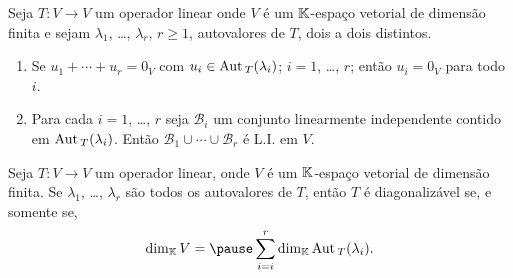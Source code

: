 \documentclass{beamer}
\begin{document}
    \begin{frame}
        \begin{teorema}
            Seja $T : V \to V$ um operador linear \pause onde $V$ é um $\mathbb{K}$-espaço vetorial de dimensão finita \pause e sejam $\lambda_1$, \pause \dots, \pause $\lambda_r$, \pause $r \ge 1$, autovalores de $T$, \pause dois a dois distintos.\pause
            \begin{enumerate}[label={\roman*})]
                \item\label{autovetorLI} Se $u_1 + \cdots + u_r = 0_V$ \pause com $u_i \in {\rm Aut\,}_T(\lambda_i)$; \pause $i = 1$, \dots, $r$; \pause então $u_i = 0_V$ \pause para todo $i$.\pause

                \vspace*{1cm}

                \item Para cada $i = 1$, \dots, $r$ \pause seja $\mathcal{B}_i$ \pause um conjunto linearmente independente \pause contido em ${\rm Aut\,}_T(\lambda_i)$. \pause Então $\mathcal{B}_1 \cup \cdots \cup \mathcal{B}_r$ \pause é L.I. em $V$.
            \end{enumerate}
        \end{teorema}
    \end{frame}

    \begin{frame}
        \begin{corolario}
            Seja $T : V \to V$ um operador linear, \pause onde $V$ é um $\mathbb{K}$-espaço vetorial \pause de dimensão finita. \pause Se $\lambda_1$, \pause \dots, \pause $\lambda_r$ \pause são todos os autovalores de $T$, \pause então $T$ é diagonalizável \pause se, e somente se,\pause
            \[
                \dim_\cp{K} V = \pause \sum_{i = i}^r\dim_\cp{K}\aut_T(\lambda_i).
            \]
        \end{corolario}
    \end{frame}
\end{document}

